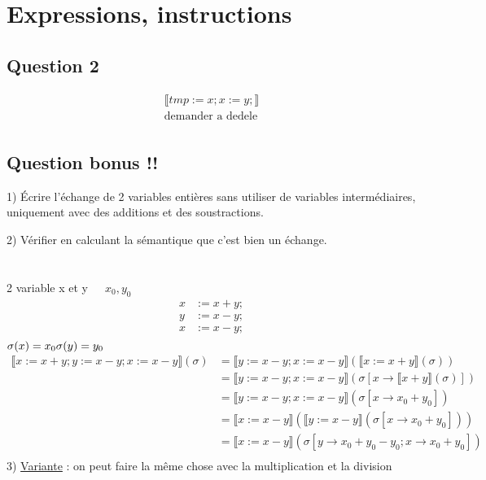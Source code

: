 \documentclass[11pt,a4paper]{article}
\begin{document}
	\section{Expressions, instructions}
	\subsection{Question 2}
	\begin{align*}
		 \llbracket tmp := x; x := y;  \rrbracket \\
		\text{demander a dedele}\\
	\end{align*}
	\subsection{Question bonus !!}
	1) Écrire l'échange de 2 variables entières sans utiliser de variables intermédiaires, uniquement avec des additions et des soustractions.
	
	2) Vérifier en calculant la sémantique que c'est bien un échange.
	\\\\\\
	2 variable x et y\ \ \   $x_{0}, y_{0}$
	\begin{align*}
		x &:= x + y;\\
		y &:= x - y;\\
		x &:= x - y;\\
	\end{align*}
	$\sigma(x) = x_{0} \\ \sigma(y) = y_{0}$
	\begin{align*}
		 \llbracket x := x + y; y := x - y; x := x - y \rrbracket (\sigma) &=  \llbracket y := x - y; x := x - y \rrbracket ( \llbracket x := x + y \rrbracket (\sigma))\\
		&=  \llbracket y := x - y; x := x - y \rrbracket (\sigma[x \to  \llbracket x + y \rrbracket (\sigma)])\\
		&=  \llbracket y := x - y; x := x - y \rrbracket (\sigma[x \to x_{0} + y_{0}])\\
		&=  \llbracket x := x - y \rrbracket ( \llbracket y := x - y \rrbracket (\sigma[x \to x_{0} + y_{0}]))\\
		&=  \llbracket x := x - y \rrbracket (\sigma[y \to x_{0} + y_{0} - y_{0}; x \to x_{0} + y_{0}])\\
	\end{align*}
	3) \underline{Variante} : on peut faire la même chose avec la multiplication et la division
	\newpage
	
\end{document}
